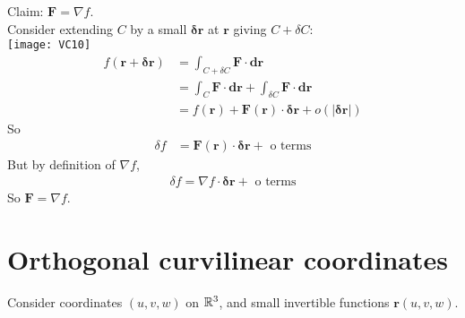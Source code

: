 \documentclass[a4paper]{article}
\begin{document}
Claim: $\mathbf{F}=\nabla f$.\\
Consider extending $C$ by a small $\mathbf{\delta r}$ at $\mathbf{r}$ giving $C+\delta C$:\\
\texttt{[image: VC10]}\\
\begin{equation*}
\begin{aligned}
f\left(\mathbf{r}+\mathbf{\delta r}\right) &= \int_{C+\delta C} \mathbf{F}\cdot\mathbf{dr}\\
&= \int_C \mathbf{F}\cdot\mathbf{dr} + \int_{\delta C} \mathbf{F}\cdot \mathbf{dr}\\
&=f\left(\mathbf{r}\right)+\mathbf{F}\left(\mathbf{r}\right)\cdot\mathbf{\delta r} + o\left(|\mathbf{\delta r}|\right)
\end{aligned}
\end{equation*}
So
\begin{equation*}
\begin{aligned}
\delta f &= \mathbf{F}\left(\mathbf{r}\right)\cdot\mathbf{\delta r} + \text{ o terms}
\end{aligned}
\end{equation*}
But by definition of $\nabla f$,
\begin{equation*}
\begin{aligned}
\delta f = \nabla f \cdot \mathbf{\delta r} + \text{ o terms}
\end{aligned}
\end{equation*}
So $\mathbf{F}=\nabla f.$\\

\newpage
\section{Orthogonal curvilinear coordinates}
Consider coordinates $\left(u,v,w\right)$ on $\mathbb{R}^3$, and small invertible functions $\mathbf{r}\left(u,v,w\right)$.\\
\end{document}

